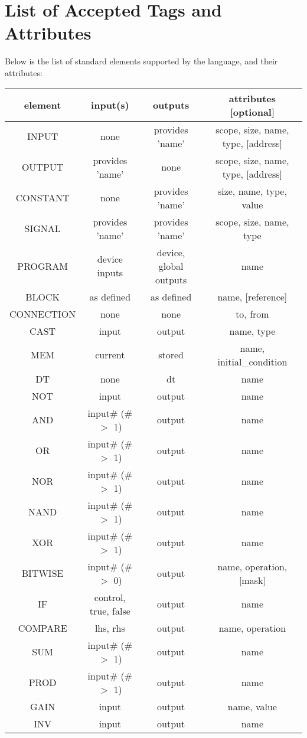 \documentclass{article}
\begin{document}
\section{List of Accepted Tags and Attributes}
Below is the list of standard elements supported by the language, and their attributes:
\begin{longtable}[c]{ |c|c|c|c| } 
    \hline
    element & input(s) & outputs & attributes [optional]  \\ 
    \hline\hline
    INPUT & none & provides 'name' & scope, size, name, type, [address] \\ 
    OUTPUT & provides 'name' & none & scope, size, name, type, [address] \\ 
    CONSTANT & none & provides 'name' & size, name, type, value \\ 
    SIGNAL & provides 'name' & provides 'name' & scope, size, name, type \\ 
    \hline
    PROGRAM & device inputs & device, global outputs & name \\ 
    BLOCK & as defined & as defined & name, [reference] \\ 
    CONNECTION & none & none & to, from \\
    \hline
    CAST & input & output & name, type \\
    MEM & current & stored & name, initial\_condition \\
    DT & none & dt & name \\
    NOT & input & output & name \\
    AND & input\# (\# $>$ 1) & output & name \\
    OR & input\# (\# $>$ 1) & output & name \\
    NOR & input\# (\# $>$ 1) & output & name \\
    NAND & input\# (\# $>$ 1) & output & name \\
    XOR & input\# (\# $>$ 1) & output & name \\
    BITWISE & input\# (\# $>$ 0) & output & name, operation, [mask] \\
    IF & control, true, false & output & name \\
    COMPARE & lhs, rhs  & output & name, operation \\
    SUM & input\# (\# $>$ 1) & output & name \\
    PROD & input\# (\# $>$ 1) & output & name \\
    GAIN & input & output & name, value \\
    INV & input & output & name \\

\end{longtable}
\end{document}
